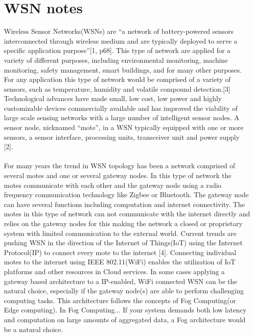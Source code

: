 \documentclass[]{uiophd}
\begin{document}
\section{WSN notes}
Wireless Sensor Networks(WSNs) are “a network of battery-powered sensors interconnected through wireless medium and are typically deployed to serve a specific application purpose”[1, p68]. This type of network are applied for a variety of different purposes, including environmental monitoring, machine monitoring, safety management, smart buildings, and for many other purposes. For any application this type of network would be comprised of a variety of sensors, such as temperature, humidity and volatile compound detection.[3] Technological advances have made small, low cost, low power and highly customizable devices commercially available and has improved the viability of large scale sensing networks with a large number of intelligent sensor nodes. A sensor node, nicknamed “mote”, in a WSN typically equipped with one or more sensors, a sensor interface, processing units, transceiver unit and power supply [2]. 
\\\\
For many years the trend in WSN topology has been a network comprised of several motes and one or several gateway nodes. In this type of network the motes communicate with each other and the gateway node using a radio frequency communication technology like Zigbee or Bluetooth. The gateway node can have several functions including computation and internet connectivity. The motes in this type of network can not communicate with the internet directly and relies on the gateway nodes for this making the network a closed or proprietary system with limited communication to the external world. Current trends are pushing WSN in the direction of the Internet of Things(IoT) using the Internet Protocol(IP) to connect every mote to the internet [4]. Connecting individual motes to the internet using  IEEE 802.11(WiFi) enables the utilization of IoT platforms and other resources in Cloud services. In some cases applying a gateway based architecture to a IP-enabled, WiFi connected WSN can be the natural choice, especially if the gateway node(s) are able to perform challenging computing tasks. This architecture follows the concepts of Fog Computing(or Edge computing). In Fog Computing... If your system demands both low latency and computation on large amounts of aggregated data, a Fog architecture would be a natural choice. 
\\\\
\end{document}
